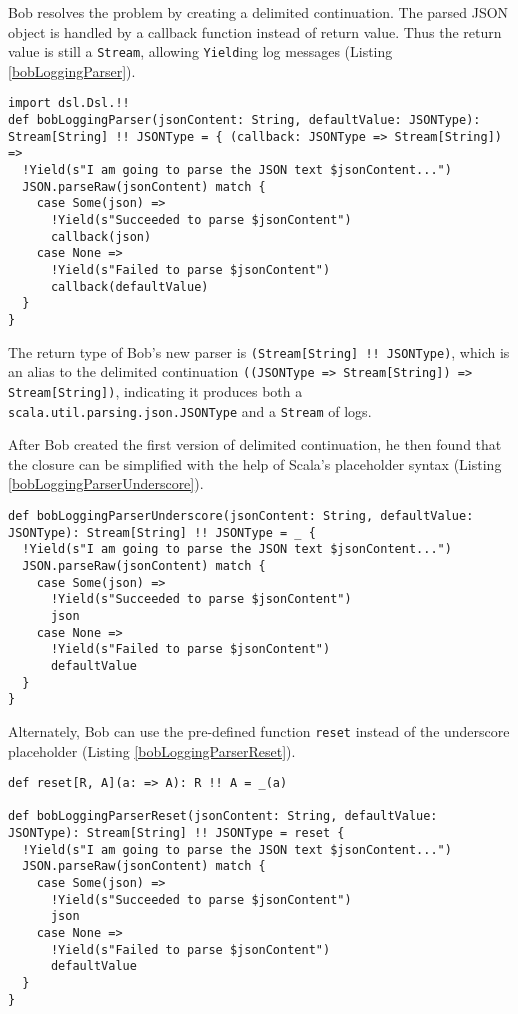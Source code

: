 Bob resolves the problem by creating a delimited continuation. The parsed JSON object is handled by a callback function instead of return value. Thus the return value is still a \lstinline{Stream}, allowing \lstinline{Yield}ing log messages (Listing \ref{bobLoggingParser}).

\begin{lstlisting}[caption={The implementation of Bob's logging parser},label={bobLoggingParser}]
import dsl.Dsl.!!
def bobLoggingParser(jsonContent: String, defaultValue: JSONType): Stream[String] !! JSONType = { (callback: JSONType => Stream[String]) =>
  !Yield(s"I am going to parse the JSON text $jsonContent...")
  JSON.parseRaw(jsonContent) match {
    case Some(json) =>
      !Yield(s"Succeeded to parse $jsonContent")
      callback(json)
    case None =>
      !Yield(s"Failed to parse $jsonContent")
      callback(defaultValue)
  }
}
\end{lstlisting}

The return type of Bob's new parser is \lstinline{(Stream[String] !! JSONType)}, which is an alias to the delimited continuation \lstinline{((JSONType => Stream[String]) => Stream[String])}, indicating it produces both a \lstinline{scala.util.parsing.json.JSONType} and a \lstinline{Stream} of logs.

After Bob created the first version of delimited continuation, he then found that the closure can be simplified with the help of Scala's placeholder syntax (Listing \ref{bobLoggingParserUnderscore}).

\begin{lstlisting}[caption={The implementation of Bob's logging parser, the underscore placeholder version},label={bobLoggingParserUnderscore}]
def bobLoggingParserUnderscore(jsonContent: String, defaultValue: JSONType): Stream[String] !! JSONType = _ {
  !Yield(s"I am going to parse the JSON text $jsonContent...")
  JSON.parseRaw(jsonContent) match {
    case Some(json) =>
      !Yield(s"Succeeded to parse $jsonContent")
      json
    case None =>
      !Yield(s"Failed to parse $jsonContent")
      defaultValue
  }
}
\end{lstlisting}

Alternately, Bob can use the pre-defined function \lstinline{reset} instead of the underscore placeholder (Listing \ref{bobLoggingParserReset}).

\begin{lstlisting}[caption={The implementation of Bob's logging parser, the reset version},label={bobLoggingParserReset}]
def reset[R, A](a: => A): R !! A = _(a)

def bobLoggingParserReset(jsonContent: String, defaultValue: JSONType): Stream[String] !! JSONType = reset {
  !Yield(s"I am going to parse the JSON text $jsonContent...")
  JSON.parseRaw(jsonContent) match {
    case Some(json) =>
      !Yield(s"Succeeded to parse $jsonContent")
      json
    case None =>
      !Yield(s"Failed to parse $jsonContent")
      defaultValue
  }
}
\end{lstlisting}

